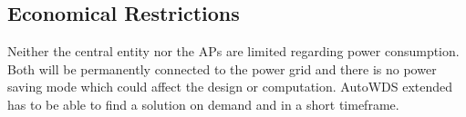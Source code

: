     \subsection{Economical Restrictions}
      Neither the central entity nor the APs are limited regarding power consumption. 
      Both will be permanently connected to the power grid and there is no power saving mode which could affect the design or computation.
      AutoWDS extended has to be able to find a solution on demand and in a short timeframe.
  